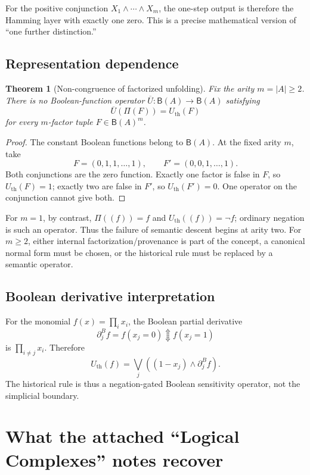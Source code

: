 \documentclass[11pt]{article}
\newtheorem{theorem}{Theorem}[section]
\newcommand{\Updown}{\mathbin{\Updownarrow}}
\begin{document}
For the positive conjunction $X_1\wedge\cdots\wedge X_m$, the one-step output is therefore the Hamming layer with exactly one zero.  This is a precise mathematical version of ``one further distinction.''

\subsection{Representation dependence}

\begin{theorem}[Non-congruence of factorized unfolding]\label{thm:noncongruence}
Fix the arity $m=|A|\ge2$.  There is no Boolean-function operator
$\overline U:\mathsf B(A)\to\mathsf B(A)$ satisfying
\[
\overline U(\Pi(F))=U_{\mathrm{th}}(F)
\]
for every $m$-factor tuple $F\in\mathsf B(A)^m$.
\end{theorem}
\begin{proof}
The constant Boolean functions belong to $\mathsf B(A)$.  At the fixed
arity $m$, take
\[
 F=(0,1,1,\ldots,1),\qquad F'=(0,0,1,\ldots,1).
\]
Both conjunctions are the zero function.  Exactly one factor is false in
$F$, so $U_{\mathrm{th}}(F)=1$; exactly two are false in $F'$, so
$U_{\mathrm{th}}(F')=0$.  One operator on the conjunction cannot give both.
\end{proof}

For $m=1$, by contrast, $\Pi((f))=f$ and
$U_{\mathrm{th}}((f))=\neg f$; ordinary negation is such an operator.
Thus the failure of semantic descent begins at arity two.  For $m\ge2$,
either internal factorization/provenance is part of the concept, a canonical
normal form must be chosen, or the historical rule must be replaced by a
semantic operator.

\subsection{Boolean derivative interpretation}
For the monomial $f(x)=\prod_i x_i$, the Boolean partial derivative
\[
\partial_j^Bf=f(x_j=0)\Updown f(x_j=1)
\]
is $\prod_{i\neq j}x_i$.  Therefore
\[
U_{\mathrm{th}}(f)
=\bigvee_j\left((1-x_j)\wedge\partial_j^Bf\right).
\]
The historical rule is thus a negation-gated Boolean sensitivity operator, not the simplicial boundary.

\section{What the attached ``Logical Complexes'' notes recover}
\end{document}
